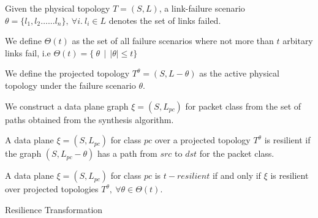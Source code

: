 \begin{mydef}
Given the physical topology $T=(S,L)$, a link-failure
scenario $\theta = \{l_1, l_2 \ldots ... l_n\},\ \forall i.\ l_i \in L$ 
denotes the set of links failed. 
\end{mydef}
\begin{mydef}
	We define $\Theta(t)$ as the set of all failure scenarios where not more than $t$
	arbitary links fail, i.e $\Theta(t) = \{ \ \theta \ \ | \ \ |\theta| \leq t\}$
\end{mydef}
\begin{mydef}
	We define
	the projected topology $T^{\theta} = (S, L - \theta)$ as the active
	physical topology under the failure scenario $\theta$.  
\end{mydef}
\noindent We construct a data plane graph $\xi = (S, L_{pc})$ for packet class from the set
of paths obtained from the synthesis algorithm. 
\begin{mydef}
	A data plane $\xi = (S, L_{pc})$ for class $pc$ over a projected topology $T^\theta$ 
	is resilient if the graph $(S, L_{pc} - \theta)$ has a path from $src$ to $dst$ 
	for the packet class. 
\end{mydef}
\begin{mydef}
	A data plane $\xi = (S, L_{pc})$ for class $pc$ is $t-resilient$ if and only if $\xi$ is 
	resilient over projected topologies $T^\theta,\ \forall \theta \in \Theta(t)$.
\end{mydef}
\begin{algorithm}[h]
	\begin{footnotesize}
		\caption{Resilience Transformation}
		\label{restransform}
		\begin{algorithmic}[1]
			\vspace*{0.25cm}
			\EndFor
			\EndFor \\
		\end{algorithmic}
	\end{footnotesize}
\end{algorithm}
